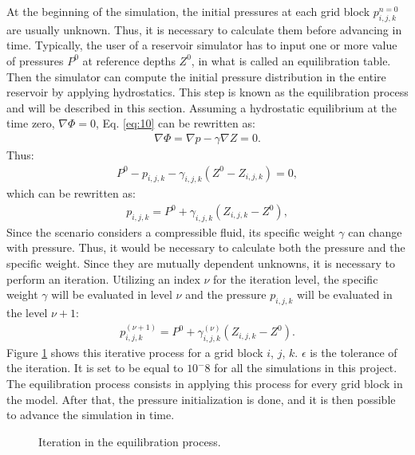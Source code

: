 At the beginning of the simulation, the initial pressures at each grid block $p_{i,j,k}^{n=0}$ are usually unknown.
%
Thus, it is necessary to calculate them before advancing in time.
%
Typically, the user of a reservoir simulator has to input one or more value of pressures $P^0$ at reference depths $Z^0$, in what is called an equilibration table.
%
Then the simulator can compute the initial pressure distribution in the entire reservoir by applying hydrostatics.
%
This step is known as the equilibration process and will be described in this section.
%
Assuming a hydrostatic equilibrium at the time zero, $\nabla \Phi = 0$, Eq. \ref{eq:10} can be rewritten as:
%
\begin{align}
	\nabla \Phi=\nabla p - \gamma \nabla Z = 0.
\end{align}
%
Thus:
%
\begin{align}
	P^0 - p_{i,j,k} - \gamma_{i,j,k}(Z^0 - Z_{i,j,k}) = 0,
\end{align}
%
which can be rewritten as:
%
\begin{align}
	p_{i,j,k}=P^0+\gamma_{i,j,k}(Z_{i,j,k}-Z^0),
\end{align}
%
Since the scenario considers a compressible fluid, its specific weight $\gamma$ can change with pressure.
%
Thus, it would be necessary to calculate both the pressure and the specific weight.
%
Since they are mutually dependent unknowns, it is necessary to perform an iteration.
%
Utilizing an index $\nu$ for the iteration level, the specific weight $\gamma$ will be evaluated in level $\nu$ and the pressure $p_{i,j,k}$ will be evaluated in the level $\nu+1$:
%
\begin{align}
	p^{(\nu+1)}_{i,j,k}=P^0+\gamma^{(\nu)}_{i,j,k}(Z_{i,j,k}-Z^0).
\end{align}
%
Figure \ref{figure-equilibration-process-flow-chart} shows this iterative process for a grid block $i$, $j$, $k$. $\epsilon$ is the tolerance of the iteration. 
%
It is set to be equal to $10^-8$ for all the simulations in this project.
%
The equilibration process consists in applying this process for every grid block in the model.
%
After that, the pressure initialization is done, and it is then possible to advance the simulation in time.
%
%
\begin{figure}[H]
	\centering
	
	\caption{Iteration in the equilibration process.}
	\label{figure-equilibration-process-flow-chart}
\end{figure}

